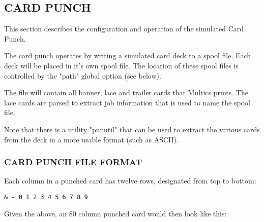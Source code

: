 
\subsection[Card Punch]{CARD PUNCH}

This section describes the configuration and operation of the simulated Card Punch.

The card punch operates by writing a simulated card deck to a spool file. Each deck
will be placed in it's own spool file. The location of these spool files is controlled
by the "path" global option (see below).

The file will contain all banner, lace and trailer cards that Multics prints. The lace
cards are parsed to extract job information that is used to name the spool file.

Note that there is a utility "punutil" that can be used to extract the various cards from
the deck in a more usable format (such as ASCII).

\subsubsection[Card Punch File Format]{CARD PUNCH FILE FORMAT}

Each column in a punched card has twelve rows, designated from top to bottom:

\begin{adjustwidth}{5ex}{1ex}
    \texttt{\& - 0 1 2 3 4 5 6 7 8 9}
\end{adjustwidth}

Given the above, an 80 column punched card would then look like this:

